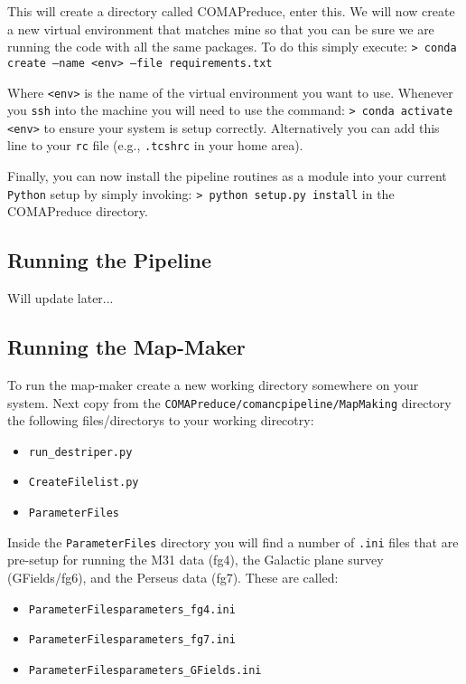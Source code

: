 \documentclass[11pt]{article}
\begin{document}
This will create a directory called COMAPreduce, enter this. We will now create a new virtual environment that matches mine so that you can be sure we are running the code with all the same packages. To do this simply execute:
\newline\noindent
\texttt{> conda create --name <env> --file requirements.txt}
\newline\noindent

Where \texttt{<env>} is the name of the virtual environment you want to use. Whenever you \texttt{ssh} into the machine you will need to use the command:
\newline\noindent
\texttt{> conda activate <env>}
\newline\noindent
to ensure your system is setup correctly. Alternatively you can add this line to your \texttt{rc} file (e.g., \texttt{.tcshrc} in your home area).

Finally, you can now install the pipeline routines as a module into your current \texttt{Python} setup by simply invoking:
\newline\noindent
\texttt{> python setup.py install}
\newline\noindent
in the COMAPreduce directory. 

\subsection{Running the Pipeline}

Will update later...

\subsection{Running the Map-Maker}

To run the map-maker create a new working directory somewhere on your system. Next copy from the \texttt{COMAPreduce/comancpipeline/MapMaking} directory the following files/directorys to your working direcotry:
\begin{itemize}
  \item \texttt{run\_destriper.py}
  \item \texttt{CreateFilelist.py}
  \item \texttt{ParameterFiles}
\end{itemize}

Inside the \texttt{ParameterFiles} directory you will find a number of \texttt{.ini} files that are pre-setup for running the M31 data (fg4), the Galactic plane survey (GFields/fg6), and the Perseus data (fg7). These are called:
\begin{itemize}
\item \texttt{ParameterFiles\/parameters\_fg4.ini}
\item \texttt{ParameterFiles\/parameters\_fg7.ini}
\item \texttt{ParameterFiles\/parameters\_GFields.ini}
\end{itemize}
\end{document}
